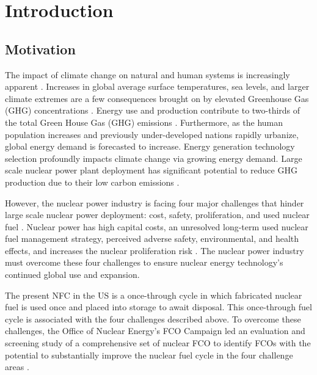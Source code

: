 \chapter[Introduction]{Introduction}
\label{chap:1}

\section{Motivation}
The impact of climate change on natural and human systems 
is increasingly apparent \cite{noauthor_climate_2018}.
Increases in global average 
surface temperatures, sea levels, and larger climate extremes
are a few consequences brought on by elevated Greenhouse Gas (GHG) 
concentrations \cite{noauthor_climate_2018}.
Energy use and production contribute to 
two-thirds of the total Green House Gas (GHG) 
emissions \cite{noauthor_climate_2018}.
Furthermore, as the human population increases and previously 
under-developed nations rapidly urbanize, 
global energy demand is forecasted to increase.  
Energy generation technology selection 
profoundly impacts climate change via growing energy demand. 
Large scale nuclear power plant deployment has significant 
potential to reduce GHG production due to their low 
carbon emissions \cite{noauthor_climate_2018}.  

However, the nuclear power industry is facing four major challenges 
that hinder large scale nuclear power deployment: 
cost, safety, proliferation, and used nuclear fuel 
\cite{massachusetts_institute_of_technology_future_2003}. 
Nuclear power has high capital costs, an unresolved 
long-term used nuclear fuel management strategy, perceived adverse safety, 
environmental, and health effects, and increases the nuclear proliferation risk
\cite{massachusetts_institute_of_technology_future_2003}. 
The nuclear power industry must overcome these four challenges 
to ensure nuclear energy technology's continued global use and expansion.

The present \gls{NFC} in the \gls{US} is a once-through cycle 
in which fabricated nuclear fuel is used once and placed into 
storage to await disposal. 
This once-through fuel cycle is associated with the four
challenges described above.
To overcome these challenges, the Office of Nuclear Energy's
\gls{FCO} Campaign led an evaluation 
and screening study of a comprehensive set of nuclear \gls{FCO} 
to identify \glspl{FCO} with the potential to substantially 
improve the nuclear fuel cycle in the four challenge areas
\cite{wigeland_nuclear_2014}. 

